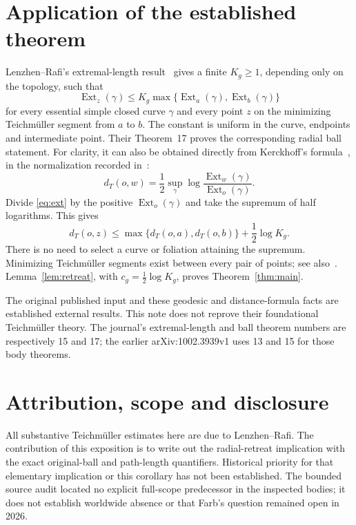 \documentclass[10pt]{article}
\newcommand{\Ext}{\operatorname{Ext}}
\begin{document}
\section{Application of the established theorem}
Lenzhen--Rafi's extremal-length result~\cite[Theorem~15]{LR} gives a
finite $K_g\geq1$, depending only on the topology, such that
\begin{equation}\label{eq:ext}
 \Ext_z(\gamma)\leq K_g
 \max\{\Ext_a(\gamma),\Ext_b(\gamma)\}
\end{equation}
for every essential simple closed curve $\gamma$ and every point $z$
on the minimizing Teichm\"uller segment from $a$ to $b$. The constant
is uniform in the curve, endpoints and intermediate point. Their
Theorem~17 proves the corresponding radial ball statement. For clarity,
it can also be obtained directly from Kerckhoff's formula~\cite{Kerckhoff},
in the normalization recorded in~\cite[Section~2, equation~(2.2)]{FR}:
\[
 d_T(o,w)=\frac12\sup_\gamma
 \log\frac{\Ext_w(\gamma)}{\Ext_o(\gamma)}.
\]
Divide \eqref{eq:ext} by the positive $\Ext_o(\gamma)$ and take the
supremum of half logarithms. This gives
\[
 d_T(o,z)\leq
 \max\{d_T(o,a),d_T(o,b)\}+\frac12\log K_g.
\]
There is no need to select a curve or foliation attaining the supremum.
Minimizing Teichm\"uller segments exist between every pair of points;
see also~\cite[Section~2]{FR}. Lemma~\ref{lem:retreat}, with
$c_g=\tfrac12\log K_g$, proves Theorem~\ref{thm:main}.

The original published input and these geodesic and distance-formula
facts are established external results. This note does not reprove their
foundational Teichm\"uller theory. The journal's extremal-length and ball
theorem numbers are respectively 15 and 17; the earlier
arXiv:1002.3939v1 uses 13 and 15 for those body theorems.

\section{Attribution, scope and disclosure}
All substantive Teichm\"uller estimates here are due to Lenzhen--Rafi.
The contribution of this exposition is to write out the radial-retreat
implication with the exact original-ball and path-length quantifiers.
Historical priority for that elementary implication or this corollary
has not been established. The bounded source audit located no explicit
full-scope predecessor in the inspected bodies; it does not establish
worldwide absence or that Farb's question remained open in 2026.
\end{document}
